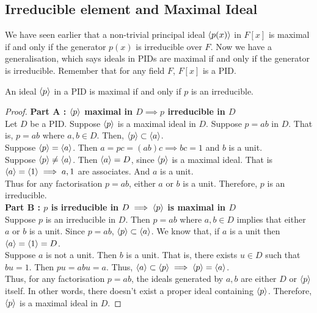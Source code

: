 \subsection{Irreducible element and Maximal Ideal}
We have seen earlier that a non-trivial principal ideal $\langle p(x)\rangle$ in $F[x]$ is maximal if and only if the generator $p(x)$ is irreducible over $F$.
Now we have a generalisation, which says ideals in PIDs are maximal if and only if the generator is irreducible.
Remember that for any field $F$, $F[x]$ is a PID.
\begin{lemma}
	An ideal $\langle p\rangle$ in a PID is maximal if and only if $p$ is an irreducible.
\end{lemma}
\begin{proof}
	\textbf{Part A : $\langle p\rangle$ maximal in $D \implies p$ irreducible in $D$}\\
	Let $D$ be a PID.
	Suppose $\langle p\rangle$ is a maximal ideal in $D$.
	Suppose $p = ab$ in $D$.
	That is, $p = ab$ where $a,b \in D$.
	Then, $\langle p\rangle \subset \langle a\rangle$.\\

	Suppose $\langle p\rangle = \langle a\rangle$.
	Then $a = pc = (ab)c \implies bc = 1$ and $b$ is a unit.\\

	Suppose $\langle p\rangle \ne \langle a\rangle$.
	Then $\langle a\rangle = D$, since $\langle p\rangle$ is a maximal ideal.
	That is $\langle a\rangle = \langle 1\rangle \implies a,1$ are associates.
	And $a$ is a unit.\\

	Thus for any factorisation $p = ab$, either $a$ or $b$ is a unit.
	Therefore, $p$ is an irreducible.\\

	\textbf{Part B : $p$ is irreducible in $D \implies \langle p\rangle$ is maximal in $D$}\\
	Suppose $p$ is an irreducible in $D$.
	Then $p = ab$ where $a,b \in D $ implies that either $a$ or $b$ is a unit.
	Since $p = ab$, $\langle p\rangle \subset \langle a\rangle$.
	We know that, if $a$ is a unit then $\langle a\rangle = \langle 1\rangle = D$.\\

	Suppose $a$ is not a unit.
	Then $b$ is a unit.
	That is, there exists $u \in D$ such that $bu = 1$.
	Then $pu = abu= a$.
	Thus, $\langle a\rangle \subset \langle p\rangle \implies \langle p\rangle = \langle a\rangle$.\\

	Thus, for any factorisation $p = ab$, the ideals generated by $a,b$ are either $D$ or $\langle p\rangle$ itself.
	In other words, there doesn't exist a proper ideal containing $\langle p\rangle$.
	Therefore, $\langle p\rangle$ is a maximal ideal in $D$.
\end{proof}

